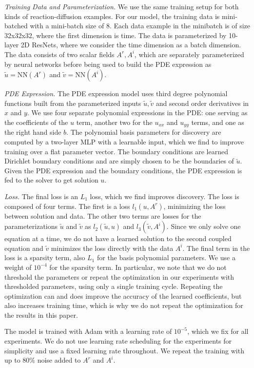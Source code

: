 \emph{Training Data and Parameterization.} We use the same training setup for both kinds of reaction-diffusion examples.
For our model, the training data is mini-batched with a mini-batch size of 8. 
Each data example in the minibatch is of size 32x32x32, where the first dimension is time.
The data is parameterized by 10-layer 2D ResNets, where we consider the time dimension as a batch dimension.
The data consists of two scalar fields $A^r, A^i$, which are separately parameterized by neural networks before being used to build the PDE expression as $\tilde{u} = \text{NN}(A^r)$ and $\tilde{v} = \text{NN}(A^i)$.

\emph{PDE Expression.} The PDE expression model uses third degree polynomial functions built from the parameterized inputs $\tilde{u}, \tilde{v}$ and second order derivatives in $x$ and $y$.
We use four separate polynomial expressions in the PDE: one serving as the coefficients of the $u$ term, another two for the $u_{xx}$ and $u_{yy}$ terms, and one as the right hand side $b$.
The polynomial basis parameters for discovery are computed by a two-layer MLP with a learnable input, which we find to improve training over a flat parameter vector. 
The boundary conditions are learned Dirichlet boundary conditions and are simply chosen to be the boundaries of $\tilde{u}$.
Given the PDE expression and the boundary conditions, the PDE expression is fed to the solver to get solution $u$.

\emph{Loss.} The final loss is an $L_1$ loss, which we find improves discovery.
The loss is composed of four terms. 
The first is a loss $l_1(u, A^r)$, minimizing the loss between solution and data.  
The other two terms are losses for the parameterizations $\tilde{u}$ and $\tilde{v}$ as $l_2(\tilde{u}, u)$ and $l_3(\tilde{v}, A^i)$.
Since we only solve one equation at a time, we do not have a learned solution to the second coupled equation and $\tilde{v}$ minimizes the loss directly with the data $A^i$.
The final term in the loss is a sparsity term, also $L_1$ for the basis polynomial parameters.
We use a weight of $10^{-4}$ for the sparsity term.
In particular, we note that we do not threshold the parameters or repeat the optimization in our experiments with thresholded parameters, using only a single training cycle.
Repeating the optimization can and does improve the accuracy of the learned coefficients, but also increases training time, which is why we do not repeat the optimization for the results in this paper.

The model is trained with Adam with a learning rate of $10^{-5}$, which we fix for all experiments.
We do not use learning rate scheduling for the experiments for simplicity and use a fixed learning rate throughout.
We repeat the training with up to $80\%$ noise added to $A^r$ and $A^i$.

